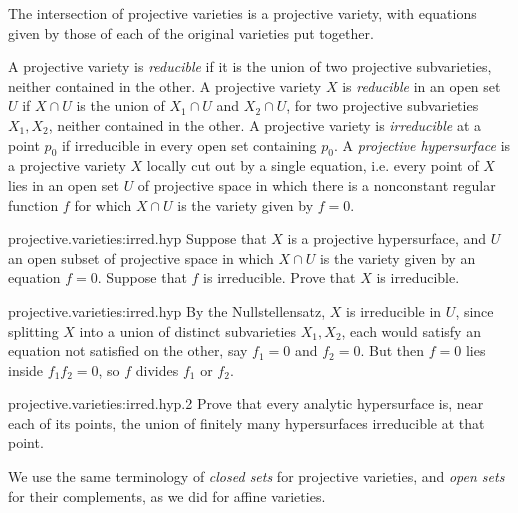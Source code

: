\begin{example}
The intersection of projective varieties is a projective variety, with equations given by those of each of the original varieties put together.
\end{example}
A projective variety is \emph{reducible} if it is the union of two projective subvarieties, neither contained in the other.
A projective variety \(X\) is \emph{reducible} in an open set \(U\) if \(X\cap U\) is the union of \(X_1\cap U\) and \(X_2\cap U\), for two projective subvarieties \(X_1,X_2\), neither contained in the other.
A projective variety is \emph{irreducible} at a point \(p_0\) if irreducible in every open set containing \(p_0\).
A \emph{projective hypersurface} is a projective variety \(X\) locally cut out by a single equation, i.e. every point of \(X\) lies in an open set \(U\) of projective space in which there is a nonconstant regular function \(f\) for which \(X\cap U\) is the variety given by \(f=0\).
\begin{problem}{projective.varieties:irred.hyp}
Suppose that \(X\) is a projective hypersurface, and \(U\) an open subset of projective space in which \(X\cap U\) is the variety given by an equation \(f=0\).
Suppose that \(f\) is irreducible.
Prove that \(X\) is irreducible.
\end{problem}
\begin{answer}{projective.varieties:irred.hyp}
By the Nullstellensatz, \(X\) is irreducible in \(U\), since splitting \(X\) into a union of distinct subvarieties \(X_1,X_2\), each would satisfy an equation not satisfied on the other, say \(f_1=0\) and \(f_2=0\).
But then \(f=0\) lies inside \(f_1f_2=0\), so \(f\) divides \(f_1\) or \(f_2\).
\end{answer}
\begin{problem}{projective.varieties:irred.hyp.2}
Prove that every analytic hypersurface is, near each of its points, the union of finitely many  hypersurfaces irreducible at that point.
\end{problem}
We use the same terminology of \emph{closed sets} for projective varieties, and \emph{open sets} for their complements, as we did for affine varieties.


